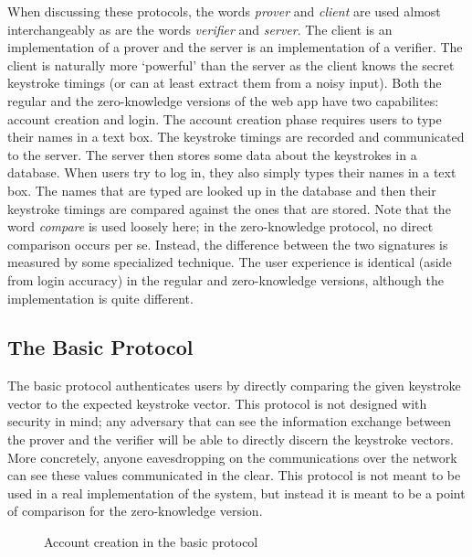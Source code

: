 \documentclass[11pt]{article}
\begin{document}
When discussing these protocols, the words \textit{prover} and \textit{client} are used almost interchangeably as are the words \textit{verifier} and \textit{server}. The client is an implementation of a prover and the server is an implementation of a verifier. The client is naturally more `powerful' than the server as the client knows the secret keystroke timings (or can at least extract them from a noisy input). Both the regular and the zero-knowledge versions of the web app have two capabilites: account creation and login. The account creation phase requires users to type their names in a text box. The keystroke timings are recorded and communicated to the server. The server then stores some data about the keystrokes in a database. When users try to log in, they also simply types their names in a text box. The names that are typed are looked up in the database and then their keystroke timings are compared against the ones that are stored. Note that the word \emph{compare} is used loosely here; in the zero-knowledge protocol, no direct comparison occurs per se. Instead, the difference between the two signatures is measured by some specialized technique. The user experience is identical (aside from login accuracy) in the regular and zero-knowledge versions, although the implementation is quite different.

\subsection{The Basic Protocol}
\label{sec:basic-prot}
The basic protocol authenticates users by directly comparing the given keystroke vector to the expected keystroke vector. This protocol is not designed with security in mind; any adversary that can see the information exchange between the prover and the verifier will be able to directly discern the keystroke vectors. More concretely, anyone eavesdropping on the communications over the network can see these values communicated in the clear. This protocol is not meant to be used in a real implementation of the system, but instead it is meant to be a point of comparison for the zero-knowledge version.

\begin{figure}[h!]
\centering
{}
\caption{Account creation in the basic protocol}
\label{fig:basic_new}
\end{figure}
\end{document}
